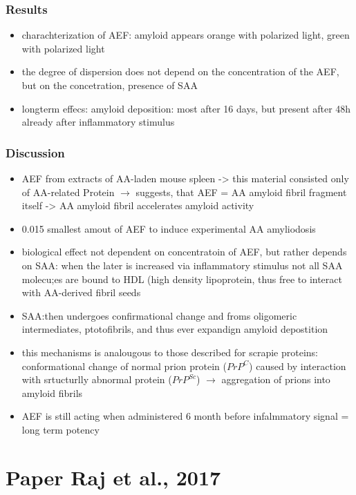 \documentclass[fleqn]{article}\usepackage{caption}
\begin{document}
\subsubsection{Results}
\begin{itemize}
\item charachterization of AEF: amyloid appears orange with polarized light, green with polarized light
\item the degree of dispersion does not depend on the concentration of the AEF, but on the concetration, presence of SAA
\item longterm effecs: amyloid deposition: most after 16 days, but present after 48h already after inflammatory stimulus
\end{itemize}

\subsubsection{Discussion}
\begin{itemize}
\item AEF from extracts of AA-laden mouse spleen -> this material consisted only of AA-related Protein $\rightarrow$ suggests, that AEF = AA amyloid fibril fragment itself -> AA amyloid fibril accelerates amyloid activity
\item 0.015 smallest amout of AEF to induce experimental AA amyliodosis
\item biological effect not dependent on concentratoin of AEF, but rather depends on SAA: when the later is increased via inflammatory stimulus not all SAA molecu;es are bound to HDL (high density lipoprotein, thus free to interact with AA-derived fibril seeds
\item SAA:then undergoes confirmational change and froms oligomeric intermediates, ptotofibrils, and thus ever expandign amyloid depostition 
\item this mechanisms is analougous to those described for scrapie proteins: conformational change of normal prion protein ($PrP^C$) caused by interaction with srtucturlly abnormal protein ($PrP^{Sc}$) $\rightarrow$  aggregation of prions into amyloid fibrils
\item AEF is still acting when administered 6 month before infalmmatory signal = long term potency
\end{itemize}


\section{Paper Raj et al., 2017}
\end{document}
